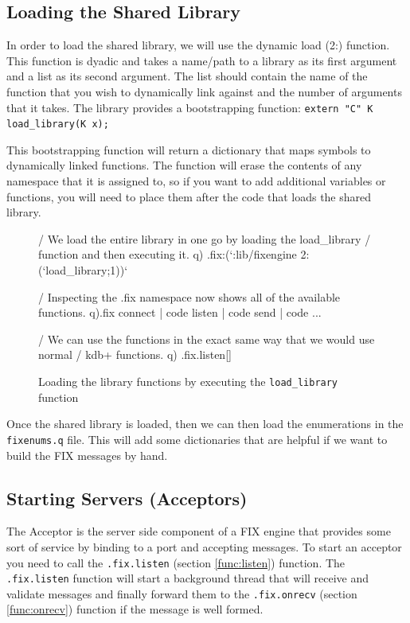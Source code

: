 \subsection{Loading the Shared Library}
In order to load the shared library, we will use the dynamic load (2:) function. This function is dyadic
and takes a name/path to a library as its first argument and a list as its second argument. The list should
contain the name of the function that you wish to dynamically link against and the number of arguments that
it takes. The library provides a bootstrapping function: \texttt{extern "C" K load_library(K x);}

This bootstrapping function will return a dictionary that maps symbols to dynamically linked functions. The
function will erase the contents of any namespace that it is assigned to, so if you want to add additional
variables or functions, you will need to place them after the code that loads the shared library.

\begin{figure}[H]
\begin{qcode}
/ We load the entire library in one go by loading the load_library
/ function and then executing it.
q) .fix:(`:lib/fixengine 2:(`load_library;1))`

/ Inspecting the .fix namespace now shows all of the available functions.
q).fix
connect              | code
listen               | code
send                 | code
...

/ We can use the functions in the exact same way that we would use normal
/ kdb+ functions.
q) .fix.listen[]
\end{qcode}
\caption{Loading the library functions by executing the \texttt{load_library} function}
\end{figure}

Once the shared library is loaded, then we can then load the enumerations in the \verb|fixenums.q| file. This will add some dictionaries that are helpful if we want
to build the FIX messages by hand.

\subsection{Starting Servers (Acceptors)}

The Acceptor is the server side component of a FIX engine that provides some sort of service by binding to a port and accepting messages. To start an acceptor you need to
call the \texttt{.fix.listen} (section \ref{func:listen}) function. The \texttt{.fix.listen} function will start a background thread that will receive and validate messages and finally forward them to the \texttt{.fix.onrecv} (section \ref{func:onrecv}) function if the message is well formed.

